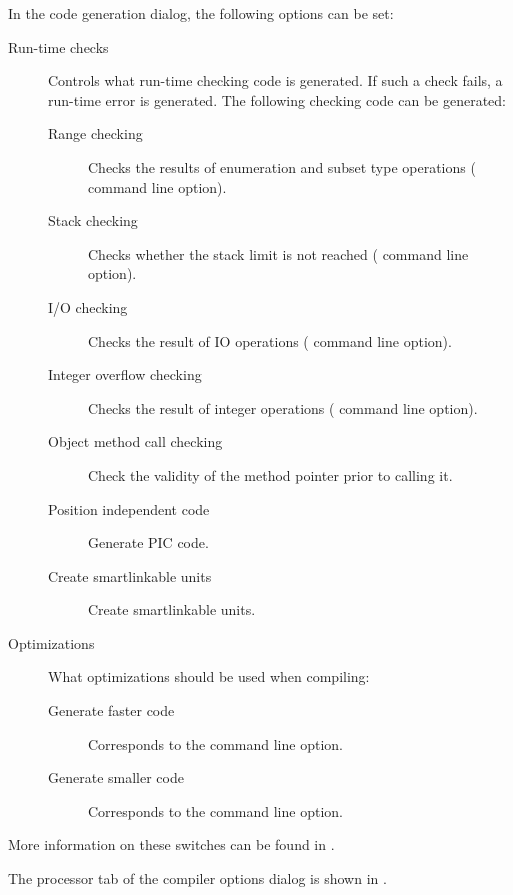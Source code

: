 
In the code generation dialog, the following options can be set:
\begin{description}
\item[Run-time checks] Controls what run-time checking code is generated. If
such a check fails, a run-time error is generated.
The following checking code can be generated:
\begin{description}
\item[Range checking] Checks the results of enumeration and subset
type operations ( command line option).
\item[Stack checking] Checks whether the stack limit is not
reached ( command line option).
\item[I/O checking] Checks the result of IO operations
( command line option).
\item[Integer overflow checking] Checks the result of integer operations
( command line option).
\item[Object method call checking] Check the validity of the method pointer
prior to calling it.
\item[Position independent code] Generate PIC code.
\item[Create smartlinkable units] Create smartlinkable units.
\end{description}
\item[Optimizations] What optimizations should be used when compiling:
\begin{description}
\item[Generate faster code] Corresponds to the  command line option.
\item[Generate smaller code] Corresponds to the  command line option.
\end{description}
\end{description}
More information on these switches can be found in .

The processor tab of the compiler options dialog is shown in
.

